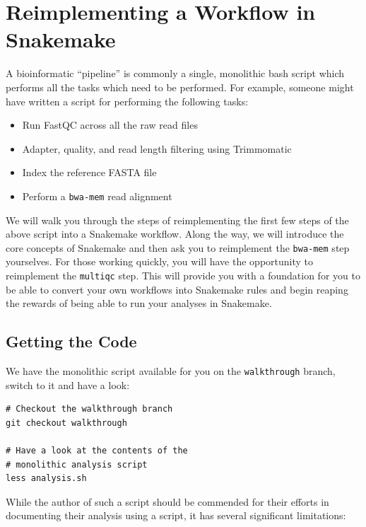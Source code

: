 \section{Reimplementing a Workflow in Snakemake}

A bioinformatic ``pipeline'' is commonly a single, monolithic bash script which performs all the tasks which need to be performed.
For example, someone might have written a script for performing the following tasks:

\begin{itemize}
  \item Run FastQC across all the raw read files
  \item Adapter, quality, and read length filtering using Trimmomatic
  \item Index the reference FASTA file
  \item Perform a \texttt{bwa-mem} read alignment
\end{itemize}

We will walk you through the steps of reimplementing the first few steps of the above script into a Snakemake workflow.
Along the way, we will introduce the core concepts of Snakemake and then ask you to reimplement the \texttt{bwa-mem} step yourselves.
For those working quickly, you will have the opportunity to reimplement the \texttt{multiqc} step.
This will provide you with a foundation for you to be able to convert your own workflows into Snakemake rules and begin reaping the rewards of being able to run your analyses in Snakemake.

\subsection{Getting the Code}

We have the monolithic script available for you on the \texttt{walkthrough} branch, switch to it and have a look:

\begin{lstlisting}
# Checkout the walkthrough branch
git checkout walkthrough

# Have a look at the contents of the
# monolithic analysis script
less analysis.sh
\end{lstlisting}

While the author of such a script should be commended for their efforts in documenting their analysis using a script, it has several significant limitations:

